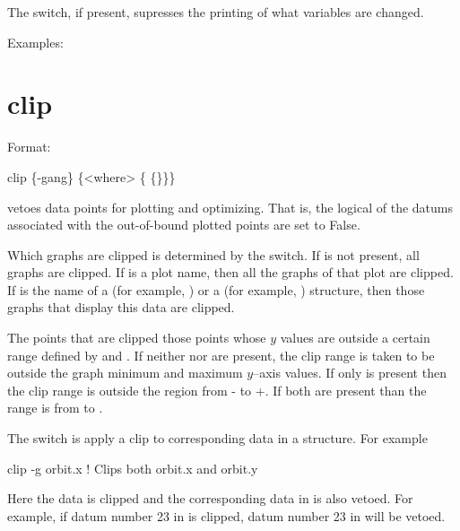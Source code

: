 {{{The  switch, if present, supresses the printing of what
variables are changed.

Examples:


\section{clip}
\label{s:clip}

Format:
\begin{example}
  clip \{-gang\} \{<where> \{<limit1> \{<limit2>\}\}\}
\end{example}

\vskip 0.2in  vetoes data points for plotting and
optimizing. That is, the  logical of the datums
associated with the out-of-bound plotted points are set to False.

Which graphs are clipped is determined by the  switch. If
 is not present, all graphs are clipped. If  is a
plot name, then all the graphs of that plot are clipped. If 
is the name of a  (for example, ) or a
 (for example, ) structure, then those graphs
that display this data are clipped.

The points that are clipped those points whose $y$ values are outside
a certain range defined by  and . If neither
 nor  are present, the clip range is taken
to be outside the graph minimum and maximum $y$--axis values. If only
 is present then the clip range is outside the region
from - to +. If both are present than the
range is from  to .

The  switch is apply a clip to corresponding data in a 
structure. For example
\begin{example}
  clip -g orbit.x   ! Clips both orbit.x and orbit.y 
\end{example}
Here the  data is clipped and the corresponding data in
 is also vetoed. For example, if datum number 23 in
 is clipped, datum number 23 in  will be
vetoed.

}}}
